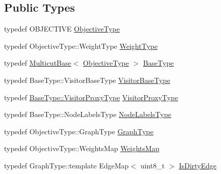 \subsection*{Public Types}
\begin{DoxyCompactItemize}
\item 
typedef O\+B\+J\+E\+C\+T\+I\+VE \hyperlink{classnifty_1_1graph_1_1opt_1_1multicut_1_1KernighanLin_aa5a1c5a577ff9d17db32d5871da3ed45}{Objective\+Type}
\item 
typedef Objective\+Type\+::\+Weight\+Type \hyperlink{classnifty_1_1graph_1_1opt_1_1multicut_1_1KernighanLin_a4269dac56c19c01ce6b3097cf1801120}{Weight\+Type}
\item 
typedef \hyperlink{classnifty_1_1graph_1_1opt_1_1multicut_1_1MulticutBase}{Multicut\+Base}$<$ \hyperlink{classnifty_1_1graph_1_1opt_1_1multicut_1_1KernighanLin_aa5a1c5a577ff9d17db32d5871da3ed45}{Objective\+Type} $>$ \hyperlink{classnifty_1_1graph_1_1opt_1_1multicut_1_1KernighanLin_a96e5bc228534b70abd37a564cfb38396}{Base\+Type}
\item 
typedef Base\+Type\+::\+Visitor\+Base\+Type \hyperlink{classnifty_1_1graph_1_1opt_1_1multicut_1_1KernighanLin_a04b6ab578786c0fae38522f49a6a9686}{Visitor\+Base\+Type}
\item 
typedef \hyperlink{classnifty_1_1graph_1_1opt_1_1common_1_1SolverBase_ad209b469b3bc9fc0fc14e9fed4d09075}{Base\+Type\+::\+Visitor\+Proxy\+Type} \hyperlink{classnifty_1_1graph_1_1opt_1_1multicut_1_1KernighanLin_a54f867c080088605f153f5dd8b8413f4}{Visitor\+Proxy\+Type}
\item 
typedef Base\+Type\+::\+Node\+Labels\+Type \hyperlink{classnifty_1_1graph_1_1opt_1_1multicut_1_1KernighanLin_acc82419d254c543b753b17fd26ef0818}{Node\+Labels\+Type}
\item 
typedef Objective\+Type\+::\+Graph\+Type \hyperlink{classnifty_1_1graph_1_1opt_1_1multicut_1_1KernighanLin_ace439723d2d7a3f596e92c38cff2e964}{Graph\+Type}
\item 
typedef Objective\+Type\+::\+Weights\+Map \hyperlink{classnifty_1_1graph_1_1opt_1_1multicut_1_1KernighanLin_a4735aadb8b152f30c509f37fdf670fc0}{Weights\+Map}
\item 
typedef Graph\+Type\+::template Edge\+Map$<$ uint8\+\_\+t $>$ \hyperlink{classnifty_1_1graph_1_1opt_1_1multicut_1_1KernighanLin_a1aa00d6c5ac675a4d5cd19361ef72701}{Is\+Dirty\+Edge}
\end{DoxyCompactItemize}
